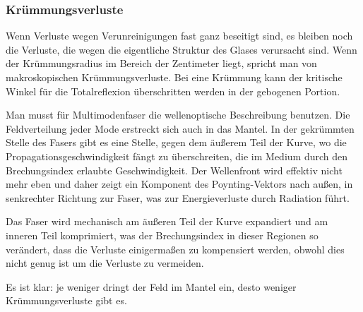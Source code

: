 \documentclass[a4paper]{article}
\begin{document}


\subsubsection{Krümmungsverluste}
Wenn Verluste wegen Verunreinigungen fast ganz beseitigt sind, es
bleiben noch die Verluste, die wegen die eigentliche Struktur des Glases
verursacht sind.  Wenn der Krümmungsradius im Bereich der Zentimeter liegt,
spricht man von makroskopischen Krümmungsverluste. 
Bei eine Krümmung kann der kritische Winkel für die Totalreflexion
überschritten werden in der gebogenen Portion. 

Man musst für Multimodenfaser die wellenoptische Beschreibung benutzen. Die
Feldverteilung jeder Mode erstreckt sich auch in das Mantel. In der gekrümmten
Stelle des Fasers gibt es eine Stelle, gegen dem äußerem Teil der Kurve, wo die
Propagationsgeschwindigkeit fängt zu überschreiten, die im Medium durch den
Brechungsindex erlaubte Geschwindigkeit. Der Wellenfront wird effektiv nicht
mehr eben und daher zeigt ein Komponent des Poynting-Vektors nach außen, in
senkrechter Richtung zur Faser, was zur Energieverluste durch Radiation führt. 

Das Faser wird mechanisch am äußeren Teil der Kurve expandiert und am inneren
Teil komprimiert, was der Brechungsindex in dieser Regionen so verändert, dass 
die Verluste einigermaßen zu kompensiert werden, obwohl dies nicht genug ist um
die Verluste zu vermeiden.

Es ist klar: je weniger dringt der Feld im Mantel ein, desto weniger
Krümmungsverluste gibt es. 
\end{document}
